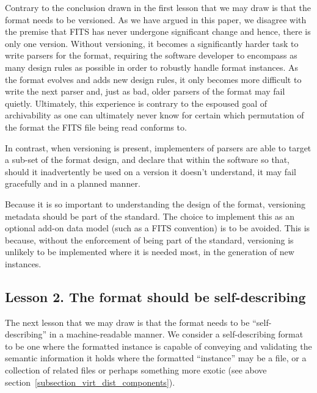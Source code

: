 \documentclass[final,authoryear,5p,times,twocolumn]{elsarticle}
\begin{document}
{{Contrary to the conclusion drawn in \citet{1997ASPC..125..257W}
the first lesson that we may draw is that the format needs to be
versioned.
As we have argued in this paper, we disagree with the premise
that FITS has never undergone significant change and hence, there
is only one version. Without versioning, it becomes a significantly
harder task to write parsers for the format, requiring the software
developer to encompass as many design rules as possible in order
to robustly handle format instances. As the format evolves and
adds new design rules, it only becomes more difficult to write the
next parser and, just as bad, older parsers of the format may fail quietly.
Ultimately, this experience is contrary to the espoused goal of
archivability as one can ultimately never know for certain which
permutation of the format the FITS file being read conforms to.


In contrast, when versioning is present, implementers of parsers
are able to target a sub-set of the format design, and declare
that within the software so that, should it inadvertently be used
on a version it doesn't understand, it may fail gracefully and
in a planned manner.


Because it is so important to understanding the design of
the format, versioning metadata should be part of the standard.
The choice to implement this as an optional add-on data model
(such as a FITS convention) is to be avoided. This is because,
without the enforcement of being part of the standard, versioning
is unlikely to be implemented where it is needed most, in the
generation of new instances.


\subsection{Lesson 2. The format should be self-describing}
\label{section_lesson_2}

The next lesson that we may draw is that the format needs to be
``self-describing'' in a machine-readable manner. 
We consider a self-describing format to be one where the formatted 
instance is capable of conveying and validating the semantic information
it holds where the formatted ``instance'' may be a file, or a 
collection of related files or perhaps something more exotic 
(see above section~\ref{subsection_virt_dist_components}).

}}
\end{document}
